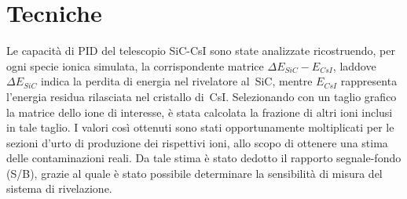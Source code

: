 \documentclass[10pt,foldmark,notumble]{leaflet}
\newcommand{\geant}{Geant4}
\begin{document}
\section{Tecniche}


Le capacità di PID del telescopio SiC-CsI sono state analizzate ricostruendo, per ogni specie ionica simulata, la corrispondente matrice $\Delta E_{SiC} - E_{CsI}$, laddove $\Delta E_{SiC}$ indica la perdita di energia nel rivelatore al~SiC, mentre $E_{CsI}$ rappresenta l'energia residua rilasciata nel cristallo di~CsI.
Selezionando con un taglio grafico la matrice dello ione di interesse, è stata calcolata la frazione di altri ioni inclusi in tale taglio.
I valori così ottenuti sono stati opportunamente moltiplicati per le sezioni d'urto di produzione dei rispettivi ioni, allo scopo di ottenere una stima delle contaminazioni reali.
Da tale stima è stato dedotto il rapporto segnale-fondo (S/B), grazie al quale è stato possibile determinare la sensibilità di misura del sistema di rivelazione.





\end{document}
